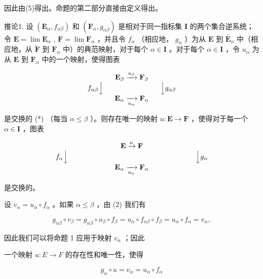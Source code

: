 因此由(5)得出。命题的第二部分直接由定义得出。

推论1. 设 \((\mathbf{E}_{\alpha}, f_{\alpha \beta})\) 和 \((\mathbf{F}_{\alpha}, g_{\alpha \beta})\) 是相对于同一指标集 \(\mathbf{I}\) 的两个集合逆系统；令 \(\mathbf{E} = \lim \mathbf{E}_{\alpha}\) , \(\mathbf{F} = \lim \mathbf{F}_{\alpha}\) ，并且令 \(f_{\alpha}\) （相应地， \(g_{\alpha}\) ）为从 \(\mathbf{E}\) 到 \(\overleftarrow{\mathbf{E}_{\alpha}}\) 中（相应地，从 \(\overleftarrow{\mathbf{F}}\) 到 \(\mathbf{F}_{\alpha}\) 中）的典范映射，对于每个 \(\alpha \in \mathbf{I}\) 。对于每个 \(\alpha \in \mathbf{I}\) ，令 \(u_{\alpha}\) 为从 \(\mathbf{E}\) 到 \(\mathbf{F}_{\alpha}\) 中的一个映射，使得图表

\[
\begin{array}{c} \mathbf {E} _ {\beta} \xrightarrow {u _ {\beta}} \mathbf {F} _ {\beta} \\ f _ {\alpha \beta} \Big \downarrow \qquad \qquad \qquad \qquad \Big \downarrow g _ {\alpha \beta} \\ \mathbf {E} _ {\alpha} \xrightarrow [ u _ {\alpha} ]{} \mathbf {F} _ {\alpha} \end{array}
\]

是交换的 (*) （每当 \(\alpha \leqslant \beta\) ）。则存在唯一的映射 \(u: \mathbf{E} \to \mathbf{F}\) ，使得对于每一个 \(\alpha \in \mathbf{I}\) ，图表

\[
\begin{array}{c} \mathbf {E} \xrightarrow {u} \mathbf {F} \\ f _ {\alpha} \Big \downarrow \qquad \qquad \qquad \qquad \qquad \qquad \qquad \qquad \qquad \Big \downarrow g _ {\alpha} \\ \mathbf {E} _ {\alpha} \xrightarrow [ u _ {\alpha} ]{} \mathbf {F} _ {\alpha} \end{array}
\]

是交换的。

设 \(v_{\alpha} = u_{\alpha} \circ f_{\alpha}\) 。如果 \(\alpha \leqslant \beta\) ，由 (2) 我们有

\[
g _ {\alpha \beta} \circ v _ {\beta} = g _ {\alpha \beta} \circ u _ {\beta} \circ f _ {\beta} = u _ {\alpha} \circ f _ {\alpha \beta} \circ f _ {\beta} = u _ {\alpha} \circ f _ {\alpha} = v _ {\alpha},
\]

因此我们可以将命题 1 应用于映射 \(v_{\alpha}\) ；因此

一个映射 \(u: E \rightarrow F\) 的存在性和唯一性，使得

\[
g _ {\alpha} \circ u = v _ {\alpha} = u _ {\alpha} \circ f _ {\alpha}
\]


